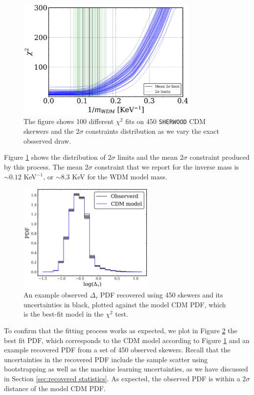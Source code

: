 \begin{figure}
    \centering
    \includegraphics[width=0.8\textwidth]{img/ML/inference_cdm_sherwood.png}
    \caption{The figure shows 100 different $\chi^2$ fits on 450 \texttt{SHERWOOD} CDM skerwers and the $2\sigma$ constraints distribution as we vary the exact obsserved draw.}
    \label{fig: inference cdm sherwood}
\end{figure}
Figure \ref{fig: inference cdm sherwood} shows the distribution of $2\sigma$ limits and the mean $2\sigma$ constraint produced by this process. The mean $2\sigma$ constraint that we report for the inverse mass is $\sim 0.12$ KeV$^{-1}$, or $\sim 8.3$ KeV for the WDM model mass.

\begin{figure}
    \centering
    \includegraphics[width=0.6\textwidth]{img/ML/pdf_model_observed.png}
    \caption{An example observed $\Delta_\tau$ PDF recovered using 450 skewers and its uncertainties in black, plotted against the model CDM PDF, which is the best-fit model in the $\chi^2$ test. }
    \label{fig: inference cdm PDF}
\end{figure}

To confirm that the fitting process works as expected, we plot in Figure \ref{fig: inference cdm PDF} the best fit PDF, which corresponds to the CDM model according to Figure \ref{fig: inference cdm sherwood} and an example recovered PDF from a set of 450 observed skewers. Recall that the uncertainties in the recovered PDF include the sample scatter using bootstrapping as well as the machine learning uncertainties, as we have discussed in Section \ref{sec:recovered statistics}. As expected, the observed PDF is within a $2\sigma$ distance of the model CDM PDF.

